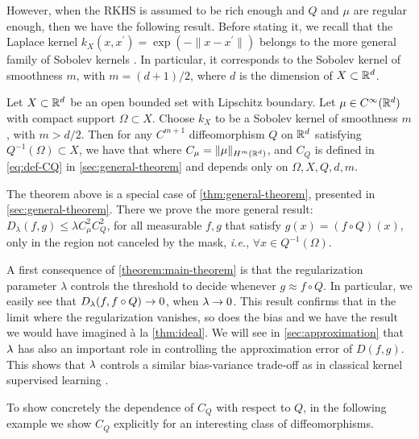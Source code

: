 However, when the RKHS is assumed to be rich enough and $Q$ and $\mu$ are regular enough, then we have the following result. Before stating it, we recall that the Laplace kernel $k_X(x,x^\prime) = \exp(-\|x-x^\prime\|)$ belongs to the more general family of Sobolev kernels \cite{wendland2004scattered}. In particular, it corresponds to the Sobolev kernel of smoothness $m$, with $m = (d+1)/2$, where $d$ is the dimension of $X \subset \mathbb R^d$.
\begin{theorem}\label{theorem:main-theorem}
Let $X \subset \mathbb R^d$ be an open bounded set with Lipschitz boundary. Let $\mu \in C^\infty(\mathbb R^d)$ with compact support $\Omega \subset X$. Choose $k_X$ to be a Sobolev kernel of smoothness $m$, with $m > d/2$. Then for any $C^{m+1}$ diffeomorphism $Q$ on $\mathbb R^d$ satisfying $Q^{-1}(\Omega) \subset X$, we have that
where $C_\mu = \|\mu\|_{H^m(\mathbb R^d)}$, and $C_Q$ is defined in \cref{eq:def-CQ} in \cref{sec:general-theorem} and depends only on $\Omega, X, Q, d, m$.
\end{theorem}
The theorem above is a special case of \cref{thm:general-theorem}, presented in \cref{sec:general-theorem}. There we prove the more general result: $D_\lambda(f,g) \leq \lambda C^2_{\mu} C^2_{Q}$, for all measurable $f, g$ that satisfy $g(x) = (f \circ Q)(x)$, only in the region not canceled by the mask, \emph{i.e.}, $\forall x \in Q^{-1}(\Omega)$.



A first consequence of \cref{theorem:main-theorem} is that the regularization parameter $\lambda$ controls the threshold to decide whenever $g \approx f \circ Q$. In particular, we easily see that $D_\lambda(f, f \circ Q) \to 0$, when $\lambda \to 0$. This result confirms that in the limit where the regularization vanishes, so does the bias and we have the result we would have imagined à la \cref{thm:ideal}. We will see in \cref{sec:approximation} that $\lambda$ has also an important role in controlling the approximation error of $D(f,g)$. This shows that $\lambda$ controls a similar bias-variance trade-off as in classical kernel supervised learning \cite{shawe-taylor2004}.

To show concretely the dependence of $C_Q$ with respect to $Q$, in the following example we show $C_Q$ explicitly for an interesting class of diffeomorphisms.

